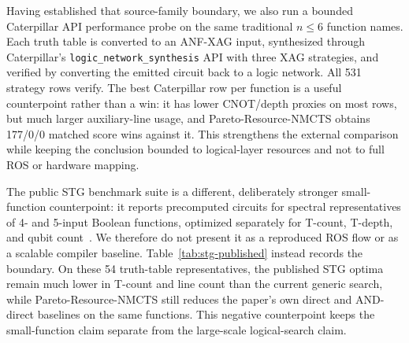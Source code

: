 \documentclass[11pt]{article}
\newcommand{\method}{Resource-NMCTS}
\begin{document}
Having established that source-family boundary, we also run a bounded
Caterpillar API performance probe on the same traditional $n\leq6$ function
names.  Each truth table is converted to an ANF-XAG input, synthesized through
Caterpillar's \texttt{logic\_network\_synthesis} API with three XAG strategies,
and verified by converting the emitted circuit back to a logic network.  All
531 strategy rows verify.  The best Caterpillar row per function is a useful
counterpoint rather than a win: it has lower CNOT/depth proxies on most rows,
but much larger auxiliary-line usage, and Pareto-\method{} obtains 177/0/0
matched score wins against it.  This strengthens the external comparison while
keeping the conclusion bounded to logical-layer resources and not to full ROS
or hardware mapping.

\begin{table}[H]
\centering
\scriptsize
\setlength{\tabcolsep}{3pt}
\caption{Caterpillar XAG API performance probe on the traditional $n\leq6$
slice.  The probe uses ANF-XAG inputs and Caterpillar's logic-network API; it is
a verified implementation-family counterpoint, not the official ROS flow.}
\label{tab:caterpillar-xag-api}

\end{table}

The public STG benchmark suite is a different, deliberately stronger
small-function counterpoint: it reports precomputed circuits for spectral
representatives of 4- and 5-input Boolean functions, optimized separately for
T-count, T-depth, and qubit count~\cite{stgBenchmark}.  We therefore do not
present it as a reproduced ROS flow or as a scalable compiler baseline.
Table~\ref{tab:stg-published} instead records the boundary.  On these 54
truth-table representatives, the published STG optima remain much lower in
T-count and line count than the current generic search, while
Pareto-\method{} still reduces the paper's own direct and AND-direct baselines
on the same functions.  This negative counterpoint keeps the small-function
claim separate from the large-scale logical-search claim.

\begin{table}[H]
\centering
\small
\caption{Published STG benchmark counterpoint on 4- and 5-input
spectral-representative truth tables.  The STG rows are public precomputed
optimum-library results, not a reproduced ROS SAT garbage-management flow.}
\label{tab:stg-published}

\end{table}
\end{document}
